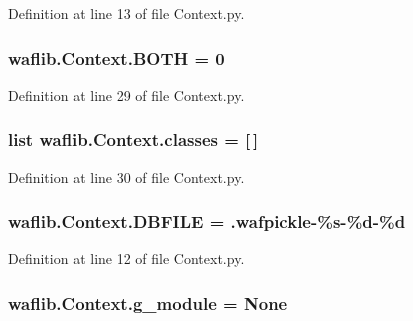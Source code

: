 Definition at line 13 of file Context.\+py.

\subsubsection[{\texorpdfstring{B\+O\+TH}{BOTH}}]{ waflib.\+Context.\+B\+O\+TH = 0}\hypertarget{namespacewaflib_1_1_context_abe194b9c4b60898c1c5a2aaf181715c1}{}\label{namespacewaflib_1_1_context_abe194b9c4b60898c1c5a2aaf181715c1}


Definition at line 29 of file Context.\+py.

\subsubsection[{\texorpdfstring{classes}{classes}}]{\setlength{\rightskip}{0pt plus 5cm}list waflib.\+Context.\+classes = \mbox{[}$\,$\mbox{]}}\hypertarget{namespacewaflib_1_1_context_a861cac13f54f517cbcbffbbf49db9414}{}\label{namespacewaflib_1_1_context_a861cac13f54f517cbcbffbbf49db9414}


Definition at line 30 of file Context.\+py.

\subsubsection[{\texorpdfstring{D\+B\+F\+I\+LE}{DBFILE}}]{ waflib.\+Context.\+D\+B\+F\+I\+LE = \textquotesingle{}.wafpickle-\/\%{\bf s}-\/\%{\bf d}-\/\%{\bf d}\textquotesingle{}}\hypertarget{namespacewaflib_1_1_context_ad004a46a5d5b3601921a121190d42551}{}\label{namespacewaflib_1_1_context_ad004a46a5d5b3601921a121190d42551}


Definition at line 12 of file Context.\+py.

\subsubsection[{\texorpdfstring{g\+\_\+module}{g_module}}]{\setlength{\rightskip}{0pt plus 5cm}waflib.\+Context.\+g\+\_\+module = None}\hypertarget{namespacewaflib_1_1_context_a34e32dcf837b42ef03d8caf4cf19240c}{}\label{namespacewaflib_1_1_context_a34e32dcf837b42ef03d8caf4cf19240c}


